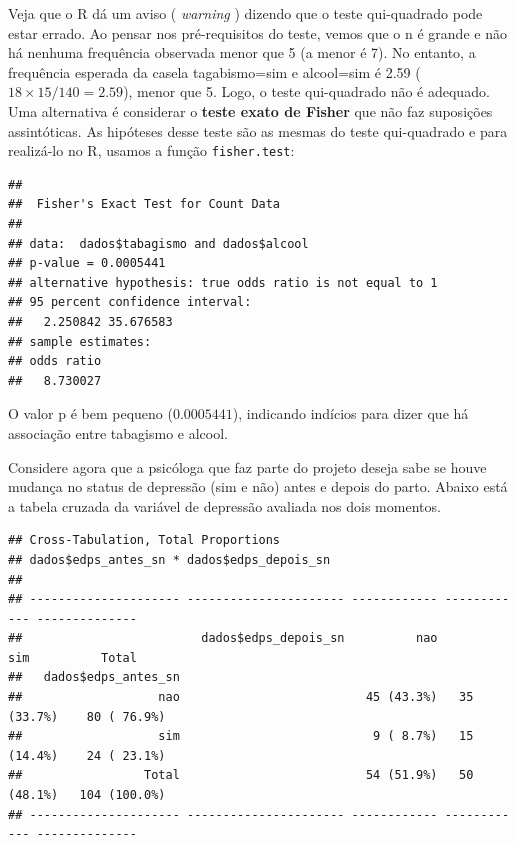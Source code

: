 \documentclass[
]{book}
\newenvironment{Shaded}{\begin{snugshade}}{\end{snugshade}}
\newcommand{\DataTypeTok}[1]{\textcolor[rgb]{0.13,0.29,0.53}{#1}}
\newcommand{\KeywordTok}[1]{\textcolor[rgb]{0.13,0.29,0.53}{\textbf{#1}}}
\newcommand{\NormalTok}[1]{#1}
\newcommand{\OperatorTok}[1]{\textcolor[rgb]{0.81,0.36,0.00}{\textbf{#1}}}
\newcommand{\StringTok}[1]{\textcolor[rgb]{0.31,0.60,0.02}{#1}}
\begin{document}
Veja que o R dá um aviso ( \emph{warning} ) dizendo que o teste qui-quadrado pode estar errado. Ao pensar nos pré-requisitos do teste, vemos que o n é grande e não há nenhuma frequência observada menor que 5 (a menor é 7). No entanto, a frequência esperada da casela tagabismo=sim e alcool=sim é 2.59 (\(18\times 15 /140=2.59\)), menor que 5. Logo, o teste qui-quadrado não é adequado. Uma alternativa é considerar o \textbf{teste exato de Fisher} que não faz suposições assintóticas. As hipóteses desse teste são as mesmas do teste qui-quadrado e para realizá-lo no R, usamos a função \texttt{fisher.test}:

\begin{Shaded}
\end{Shaded}

\begin{verbatim}
## 
## 	Fisher's Exact Test for Count Data
## 
## data:  dados$tabagismo and dados$alcool
## p-value = 0.0005441
## alternative hypothesis: true odds ratio is not equal to 1
## 95 percent confidence interval:
##   2.250842 35.676583
## sample estimates:
## odds ratio 
##   8.730027
\end{verbatim}

O valor p é bem pequeno (\(0.0005441\)), indicando indícios para dizer que há associação entre tabagismo e alcool.

Considere agora que a psicóloga que faz parte do projeto deseja sabe se houve mudança no status de depressão (sim e não) antes e depois do parto. Abaixo está a tabela cruzada da variável de depressão avaliada nos dois momentos.

\begin{Shaded}
\end{Shaded}

\begin{verbatim}
## Cross-Tabulation, Total Proportions  
## dados$edps_antes_sn * dados$edps_depois_sn  
## 
## --------------------- ---------------------- ------------ ------------ --------------
##                         dados$edps_depois_sn          nao          sim          Total
##   dados$edps_antes_sn                                                                
##                   nao                          45 (43.3%)   35 (33.7%)    80 ( 76.9%)
##                   sim                           9 ( 8.7%)   15 (14.4%)    24 ( 23.1%)
##                 Total                          54 (51.9%)   50 (48.1%)   104 (100.0%)
## --------------------- ---------------------- ------------ ------------ --------------
\end{verbatim}
\end{document}
